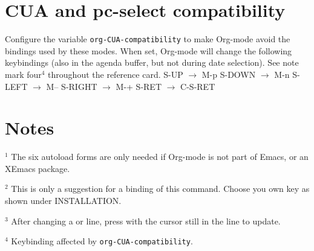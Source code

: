 \section{CUA and pc-select compatibility}

Configure the variable {\tt org-CUA-compatibility} to make Org-mode
avoid the  bindings used by these modes.  When set,
Org-mode will change the following keybindings (also in the agenda
buffer, but not during date selection). See note mark four$^4$
throughout the reference card.
\beginexample
S-UP    $\to$ M-p             S-DOWN  $\to$ M-n
S-LEFT  $\to$ M--             S-RIGHT $\to$ M-+
S-RET   $\to$ C-S-RET
\endexample

\section{Notes}
$^1$ The six autoload forms are only needed if Org-mode is not part of
Emacs, or an XEmacs package.

$^2$ This is only a suggestion for a binding of this command.  Choose
you own key as shown under INSTALLATION.

$^3$ After changing a  or  line,
press  with the cursor still in the line to update.

$^4$ Keybinding affected by {\tt org-CUA-compatibility}.

\copyrightnotice

\bye



